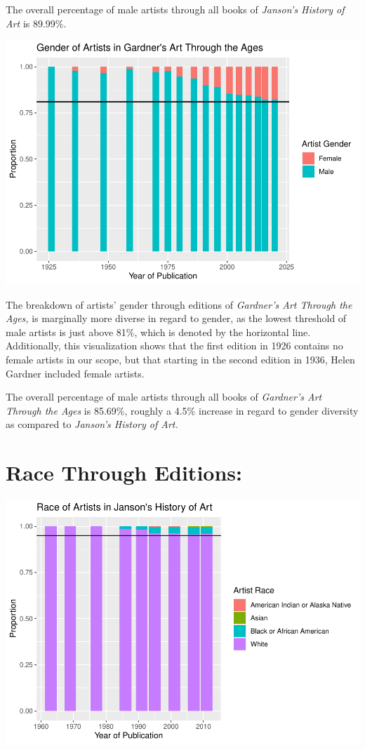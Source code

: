 \documentclass[
  letterpaper,
  DIV=11,
  numbers=noendperiod]{scrreprt}
\begin{document}
The overall percentage of male artists through all books of
\emph{Janson's History of Art} is 89.99\%.

\includegraphics{Chapter1/Chapter1_files/figure-pdf/gardnergenderthroughtime-1.pdf}

The breakdown of artists' gender through editions of \emph{Gardner's Art
Through the Ages,} is marginally more diverse in regard to gender, as
the lowest threshold of male artists is just above 81\%, which is
denoted by the horizontal line. Additionally, this visualization shows
that the first edition in 1926 contains no female artists in our scope,
but that starting in the second edition in 1936, Helen Gardner included
female artists.

The overall percentage of male artists through all books of
\emph{Gardner's Art Through the Ages} is 85.69\%, roughly a 4.5\%
increase in regard to gender diversity as compared to \emph{Janson's
History of Art.}

\hypertarget{race-through-editions}{%
\section{\texorpdfstring{\textbf{Race Through
Editions:}}{Race Through Editions:}}\label{race-through-editions}}

\includegraphics{Chapter1/Chapter1_files/figure-pdf/jansonracethroughtime-1.pdf}
\end{document}
